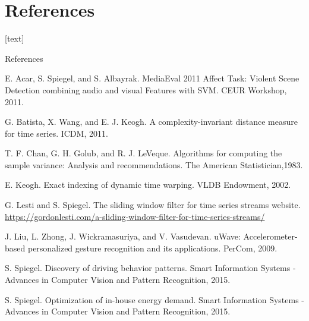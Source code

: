 \section{References}

[text]

\begin{frame}[allowframebreaks]{References}
    \begin{thebibliography}{11}
        E. Acar, S. Spiegel, and S. Albayrak.
        MediaEval 2011 Affect Task: Violent Scene Detection combining audio and visual Features with SVM.
        CEUR Workshop, 2011.

        G. Batista, X. Wang, and E. J. Keogh.
        A complexity-invariant distance measure for time series.
        ICDM, 2011.

        T. F. Chan, G. H. Golub, and R. J. LeVeque.
        Algorithms for computing the sample variance: Analysis and recommendations.
        The American Statistician,1983.

        E. Keogh.
        Exact indexing of dynamic time warping.
        VLDB Endowment, 2002.

        G. Lesti and S. Spiegel.
        The sliding window filter for time series streams website.
        \url{https://gordonlesti.com/a-sliding-window-filter-for-time-series-streams/}

        J. Liu, L. Zhong, J. Wickramasuriya, and V. Vasudevan.
        uWave: Accelerometer-based personalized gesture recognition and its applications.
        PerCom, 2009.

        S. Spiegel.
        Discovery of driving behavior patterns.
        Smart Information Systems - Advances in Computer Vision and Pattern Recognition, 2015.

        S. Spiegel.
        Optimization of in-house energy demand.
        Smart Information Systems - Advances in Computer Vision and Pattern Recognition, 2015.
    \end{thebibliography}
\end{frame}

